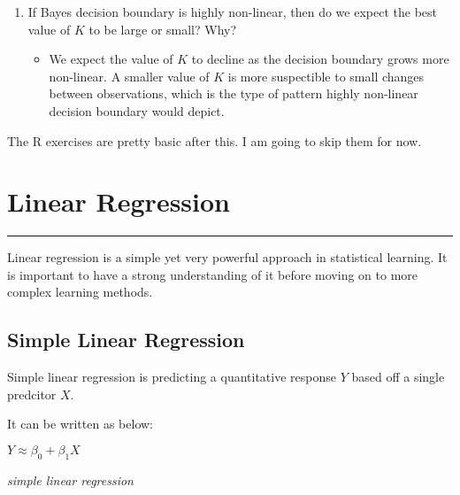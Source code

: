 \documentclass[]{book}
\providecommand{\tightlist}{%
  \setlength{\itemsep}{0pt}\setlength{\parskip}{0pt}}
\theoremstyle{definition}
\theoremstyle{definition}
\theoremstyle{definition}
\theoremstyle{remark}
\begin{document}
\begin{enumerate}
\def\labelenumi{(\alph{enumi})}
\setcounter{enumi}{3}
\tightlist
\item
  If Bayes decision boundary is highly non-linear, then do we expect the
  best value of \(K\) to be large or small? Why?

  \begin{itemize}
  \tightlist
  \item
    We expect the value of \(K\) to decline as the decision boundary
    grows more non-linear. A smaller value of \(K\) is more suspectible
    to small changes between observations, which is the type of pattern
    highly non-linear decision boundary would depict.
  \end{itemize}
\end{enumerate}

The R exercises are pretty basic after this. I am going to skip them for
now.

\chapter{Linear Regression}\label{linear-regression}

\begin{center}\rule{0.5\linewidth}{\linethickness}\end{center}

Linear regression is a simple yet very powerful approach in statistical
learning. It is important to have a strong understanding of it before
moving on to more complex learning methods.

\section{Simple Linear Regression}\label{simple-linear-regression}

Simple linear regression is predicting a quantitative response \(Y\)
based off a single predcitor \(X\).

It can be written as below:

\(Y \approx \beta_0 + \beta_1X\)

\emph{simple linear regression}
\end{document}
